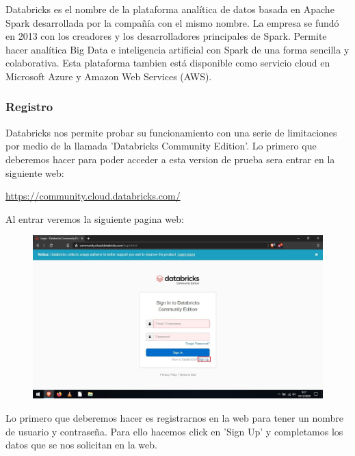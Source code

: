 \documentclass[a4paper,10pt]{article}
\begin{document}
Databricks es el nombre de la plataforma analítica de datos basada en Apache Spark desarrollada por la compañía con el mismo nombre. La empresa se fundó en 2013 con los creadores y los desarrolladores principales de Spark. Permite hacer analítica Big Data e inteligencia artificial con Spark de una forma sencilla y colaborativa. Esta plataforma tambien está disponible como servicio cloud en Microsoft Azure y Amazon Web Services (AWS).

\subsubsection{Registro}

Databricks nos permite probar su funcionamiento con una serie de limitaciones por medio de la llamada 'Databricks Community Edition'. Lo primero que deberemos hacer para poder acceder a esta version de prueba sera entrar en la siguiente web:

\href{https://community.cloud.databricks.com/}{https://community.cloud.databricks.com/}

Al entrar veremos la siguiente pagina web:

\begin{figure}[H]
\begin{center}
\includegraphics[width=500pt]{./fotos/Databricks/1 - Databricks (V).jpg}
\end{center}
\end{figure}

Lo primero que deberemos hacer es registrarnos en la web para tener un nombre de usuario y contraseña. Para ello hacemos click en 'Sign Up' y completamos los datos que se nos solicitan en la web.
\end{document}
